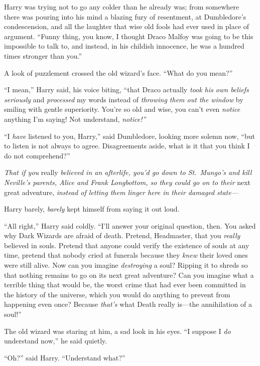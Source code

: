 Harry was trying not to go any colder than he already was; from
somewhere there was pouring into his mind a blazing fury of resentment,
at Dumbledore's condescension, and all the laughter that wise old fools
had ever used in place of argument. ``Funny thing, you know, I thought
Draco Malfoy was going to be this impossible to talk to, and instead, in
his childish innocence, he was a hundred times stronger than you.''

A look of puzzlement crossed the old wizard's face. ``What do you
mean?''

``I mean,'' Harry said, his voice biting, ``that Draco actually
\emph{took his own beliefs seriously} and \emph{processed} my words
instead of \emph{throwing them out the window} by smiling with gentle
superiority. You're so old and wise, you can't even \emph{notice}
anything I'm saying! Not understand, \emph{notice!''}

``I \emph{have} listened to you, Harry,'' said Dumbledore, looking more
solemn now, ``but to listen is not always to agree. Disagreements aside,
what is it that you think I do not comprehend?''

\emph{That if you} really \emph{believed in an afterlife, you'd go down
to St.~Mungo's and kill Neville's parents, Alice and Frank Longbottom,
so they could go on to their} next great adventure, \emph{instead of
letting them linger here in their damaged state---}

Harry barely, \emph{barely} kept himself from saying it out loud.

``All right,'' Harry said coldly. ``I'll answer your original question,
then. You asked why Dark Wizards are afraid of death. Pretend,
Headmaster, that you \emph{really} believed in souls. Pretend that
anyone could verify the existence of souls at any time, pretend that
nobody cried at funerals because they \emph{knew} their loved ones were
still alive. Now can you imagine \emph{destroying} a soul? Ripping it to
shreds so that nothing remains to go on its next great adventure? Can
you imagine what a terrible thing that would be, the worst crime that
had ever been committed in the history of the universe, which you would
do anything to prevent from happening even once? Because \emph{that's}
what Death really is---the annihilation of a soul!''

The old wizard was staring at him, a sad look in his eyes. ``I suppose I
\emph{do} understand now,'' he said quietly.

``Oh?'' said Harry. ``Understand what?''

